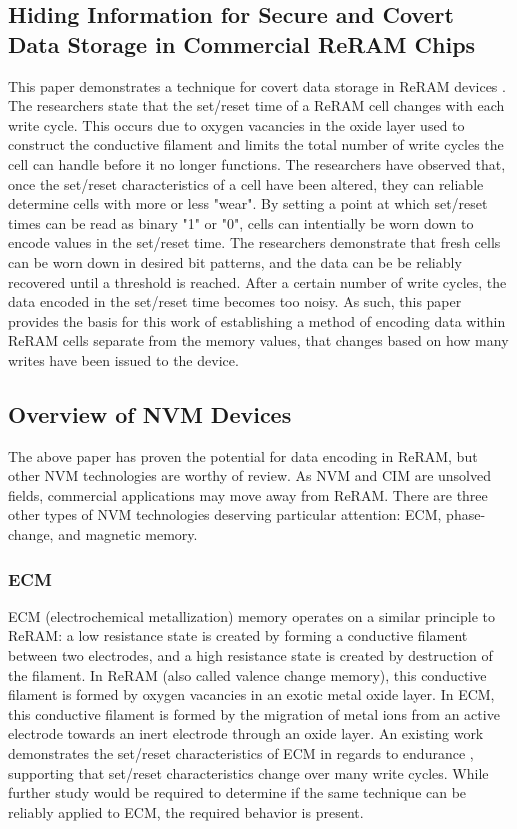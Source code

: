 \documentclass[sigconf,authoryear]{acmart}
\begin{document}
\subsection{Hiding Information for Secure and Covert Data Storage in Commercial ReRAM Chips}
This paper demonstrates a technique for covert data storage in ReRAM devices \cite{ReRAM_hiding}. The researchers state that the set/reset time of
a ReRAM cell changes with each write cycle. This occurs due to oxygen vacancies in the oxide layer used to construct the conductive
filament and limits the total number of write cycles the cell can handle before it no longer functions. The researchers have observed
that, once the set/reset characteristics of a cell have been altered, they can reliable determine cells with more or less "wear". By
setting a point at which set/reset times can be read as binary "1" or "0", cells can intentially be worn down to encode values in the
set/reset time. The researchers demonstrate that fresh cells can be worn down in desired bit patterns, and the data can be be reliably
recovered until a threshold is reached. After a certain number of write cycles, the data encoded in the set/reset time becomes too 
noisy. As such, this paper provides the basis for this work of establishing a method of encoding data within ReRAM cells separate from 
the memory values, that changes based on how many writes have been issued to the device.

\subsection{Overview of NVM Devices}
The above paper has proven the potential for data encoding in ReRAM, but other NVM technologies are worthy of review. As NVM and CIM are 
unsolved fields, commercial applications may move away from ReRAM. There are three other types of NVM technologies deserving particular 
attention: ECM, phase-change, and magnetic memory. 

\subsubsection{ECM} 
ECM (electrochemical metallization) memory operates on a similar principle to ReRAM: 
a low resistance state is created by forming a conductive filament between two electrodes, and a high resistance state is created by 
destruction of the filament. In ReRAM (also called valence change memory), this conductive filament is formed by oxygen vacancies 
in an exotic metal oxide layer. In ECM, this conductive filament is formed by the migration of metal ions from an active electrode
towards an inert electrode through an oxide layer. An existing work demonstrates the set/reset characteristics of ECM in regards to 
endurance \cite{ECM}, supporting that set/reset characteristics change over many write cycles. While further study would be required to 
determine if the same technique can be reliably applied to ECM, the required behavior is present.
\end{document}
